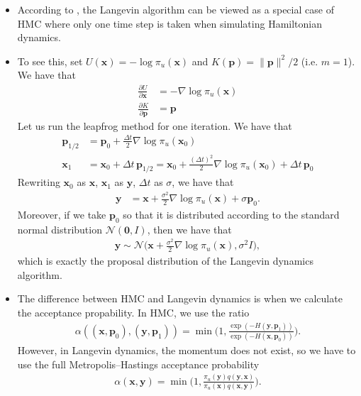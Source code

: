 \documentclass[10pt]{article}
\newcommand{\ve}[1]{\mathbf{#1}}
\newcommand{\mcal}[1]{\mathcal{#1}}
\begin{document}
\begin{itemize}
  \item According to \cite{Neal:2011}, the Langevin algorithm can be viewed as a special case of HMC where only one time step is taken when simulating Hamiltonian dynamics.
  
  \item To see this, set $U(\ve{x}) = - \log \pi_u(\ve{x})$ and $K(\ve{p}) = \|\ve{p}\|^2/2$ (i.e. $m = 1$). We have that
  \begin{align*}
    \frac{\partial U}{\partial \ve{x}} &= -\nabla \log \pi_u(\ve{x}) \\
    \frac{\partial K}{\partial \ve{p}} &= \ve{p}
  \end{align*}
  Let us run the leapfrog method for one iteration. We have that
  \begin{align*}
    \ve{p}_{1/2} &= \ve{p}_0 + \frac{\Delta t}{2} \nabla \log \pi_u(\ve{x}_0) \\
    \ve{x}_1 &= \ve{x}_0 + \Delta t\, \ve{p}_{1/2} = \ve{x}_0 + \frac{(\Delta t)^2}{2} \nabla \log \pi_u(\ve{x}_0) + \Delta t\, \ve{p}_0
  \end{align*}
  Rewriting $\ve{x}_0$ as $\ve{x}$, $\ve{x}_1$ as $\ve{y}$, $\Delta t$ as $\sigma$, we have that
  \begin{align} \label{eqn:hmc-one-step}
    \ve{y} &= \ve{x} + \frac{\sigma^2}{2} \nabla \log \pi_u(\ve{x}) + \sigma \ve{p}_0.
  \end{align}
  Moreover, if we take $\ve{p}_0$ so that it is distributed according to the standard normal distribution $\mcal{N}(\ve{0}, I)$, then we have that
  \begin{align*}
    \ve{y} \sim \mcal{N}\bigg( \ve{x} + \frac{\sigma^2}{2} \nabla \log \pi_u(\ve{x}), \sigma^2 I \bigg),
  \end{align*}
  which is exactly the proposal distribution of the Langevin dynamics algorithm.

  \item The difference between HMC and Langevin dynamics is when we calculate the acceptance propability. In HMC, we use the ratio 
  \begin{align*}
    \alpha((\ve{x},\ve{p}_0), (\ve{y},\ve{p}_1)) = \min\bigg(1, \frac{\exp(-H(\ve{y},\ve{p}_1))}{\exp(-H(\ve{x},\ve{p}_0))} \bigg).
  \end{align*}
  However, in Langevin dynamics, the momentum does not exist, so we have to use the full Metropolis--Hastings acceptance probability
  \begin{align*}
    \alpha(\ve{x},\ve{y}) = \min\bigg( 1, \frac{\pi_u(\ve{y}) q(\ve{y},\ve{x}) }{\pi_u(\ve{x}) q(\ve{x},\ve{y})} \bigg).
  \end{align*}
\end{itemize}
\end{document}
